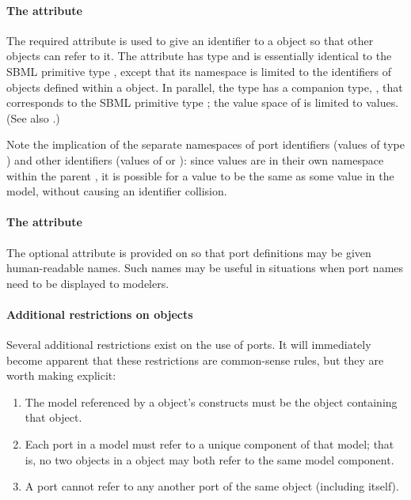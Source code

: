 \paragraph{The \fixttspace{} attribute}

The required attribute  is used to give an identifier to a
\Port object so that other objects can refer to it.  The attribute has
type  and is essentially identical to the SBML
primitive type , except that its namespace is limited to
the identifiers of \Port objects defined within a \Model object.  In
parallel, the  type has a companion type,
, that corresponds to the SBML primitive type
; the value space of  is limited
to  values.  (See also .)

Note the implication of the separate namespaces of port identifiers
(values of type ) and other identifiers (values of
 or ): since  values
are in their own namespace within the parent \Model, it is possible for
a  value to be the same as some  value
in the model, without causing an identifier collision.


\paragraph{The \fixttspace{} attribute}

The optional  attribute is provided on \Port so that port
definitions may be given human-readable names.  Such names may be useful
in situations when port names need to be displayed to modelers.


\paragraph{Additional restrictions on  objects}

Several additional restrictions exist on the use of ports.  It will
immediately become apparent that these restrictions are common-sense
rules, but they are worth making explicit:

\begin{enumerate}

  \item The model referenced by a \Port object's \SBaseRef constructs
    must be the \Model object containing that \Port object.

  \item Each port in a model must refer to a unique component of that
    model; that is, no two \Port objects in a \Model object may both
    refer to the same model component.

  \item A port cannot refer to any another port of the same \Model
    object (including itself).

\end{enumerate}
  
